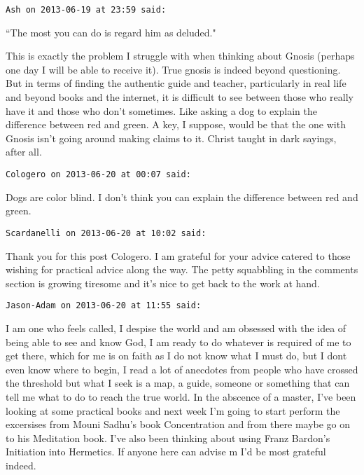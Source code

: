 \begin{footnotesize}\begin{sffamily}



\texttt{Ash on 2013-06-19 at 23:59 said: }

``The most you can do is regard him as deluded."

This is exactly the problem I struggle with when thinking about Gnosis (perhaps one day I will be able to receive it). True gnosis is indeed beyond questioning. But in terms of finding the authentic guide and teacher, particularly in real life and beyond books and the internet, it is difficult to see between those who really have it and those who don't sometimes. Like asking a dog to explain the difference between red and green. A key, I suppose, would be that the one with Gnosis isn't going around making claims to it. Christ taught in dark sayings, after all.


\hfill

\texttt{Cologero on 2013-06-20 at 00:07 said: }

Dogs are color blind. I don't think you can explain the difference between red and green.


\hfill

\texttt{Scardanelli on 2013-06-20 at 10:02 said: }

Thank you for this post Cologero. I am grateful for your advice catered to those wishing for practical advice along the way. The petty squabbling in the comments section is growing tiresome and it's nice to get back to the work at hand.


\hfill

\texttt{Jason-Adam on 2013-06-20 at 11:55 said: }

I am one who feels called, I despise the world and am obsessed with the idea of being able to see and know God, I am ready to do whatever is required of me to get there, which for me is on faith as I do not know what I must do, but I dont even know where to begin, I read a lot of anecdotes from people who have crossed the threshold but what I seek is a map, a guide, someone or something that can tell me what to do to reach the true world. In the abscence of a master, I've been looking at some practical books and next week I'm going to start perform the excersises from Mouni Sadhu's book Concentration and from there maybe go on to his Meditation book. I've also been thinking about using Franz Bardon's Initiation into Hermetics. If anyone here can advise m I'd be most grateful indeed.



\end{sffamily}
\end{footnotesize}
